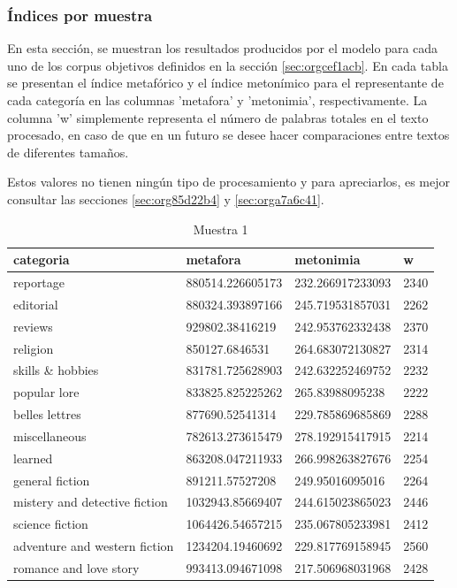 \documentclass[12pt,letterpaper,twoside]{article}
\begin{document}
\subsubsection{Índices por muestra}
\label{sec:org4e4b762}
En esta sección, se muestran los resultados producidos por el modelo
para cada uno de los corpus objetivos definidos en la sección
\ref{sec:orgcef1acb}. En cada tabla se presentan el índice
metafórico y el índice metonímico para el representante de cada
categoría en las columnas 'metafora' y 'metonimia',
respectivamente. La columna 'w' simplemente representa el número de
palabras totales en el texto procesado, en caso de que en un futuro se
desee hacer comparaciones entre textos de diferentes tamaños.

Estos valores no tienen ningún tipo de procesamiento y para apreciarlos, es mejor
consultar las secciones \ref{sec:org85d22b4} y \ref{sec:orga7a6c41}.

\small
\begin{center}
    \begin{longtable}{| p{} | p{} | p{}|p{}|}
    \caption{Muestra 1}
    \hline
        categoria & metafora & metonimia & w \\ \hline
        reportage & 880514.226605173 & 232.266917233093 & 2340 \\ \hline
        editorial & 880324.393897166 & 245.719531857031 & 2262 \\ \hline
        reviews & 929802.38416219 & 242.953762332438 & 2370 \\ \hline
        religion & 850127.6846531 & 264.683072130827 & 2314 \\ \hline
        skills \& hobbies & 831781.725628903 & 242.632252469752 & 2232 \\ \hline
        popular lore & 833825.825225262 & 265.83988095238 & 2222 \\ \hline
        belles lettres & 877690.52541314 & 229.785869685869 & 2288 \\ \hline
        miscellaneous & 782613.273615479 & 278.192915417915 & 2214 \\ \hline
        learned & 863208.047211933 & 266.998263827676 & 2254 \\ \hline
        general fiction & 891211.57527208 & 249.95016095016 & 2264 \\ \hline
        mistery and detective fiction & 1032943.85669407 & 244.615023865023 & 2446 \\ \hline
        science fiction & 1064426.54657215 & 235.067805233981 & 2412 \\ \hline
        adventure and western fiction & 1234204.19460692 & 229.817769158945 & 2560 \\ \hline
        romance and love story & 993413.094671098 & 217.506968031968 & 2428 \\ \hline
\end{longtable}
\label{muestra1}
\end{center}
\end{document}
